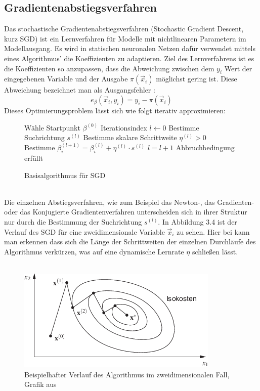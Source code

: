 \subsection{Gradientenabstiegsverfahren}
Das stochastische Gradientenabstiegsverfahren (Stochastic Gradient Descent, kurz SGD) ist ein Lernverfahren für Modelle mit nichtlinearen Parametern im Modellausgang. Es wird in statischen neuronalen Netzen dafür verwendet mittels eines Algorithmus' die Koeffizienten zu adaptieren. Ziel des Lernverfahrens ist es die Koeffizienten so anzupassen, dass die Abweichung  zwischen dem $y_i$ Wert der eingegebenen Variable und der Ausgabe $\pi(\vec x_i)$ möglichst gering ist. Diese Abweichung bezeichnet man als Ausgangsfehler \cite{IV}:
\begin{displaymath}
e_{\beta}(\vec x_i , y_i)=y_i-\pi(\vec x_i)
\end{displaymath}
Dieses Optimierungsproblem lässt sich wie folgt iterativ approximieren:
\begin{figure}[ht]
\centering
\begin{algorithmic}[1]
\STATE Wähle Startpunkt $\beta^{(0)}$
\STATE Iterationsindex $l \leftarrow 0$
\REPEAT
\STATE Bestimme Suchrichtung $s^{(l)}$
\STATE Bestimme skalare Schrittweite $\eta^{(l)} > 0$
\STATE Bestimme $\beta_i^{(l+1)} = \beta_i^{(l)} + \eta^{(l)} \cdot s^{(l)}$
\ENDFOR
\STATE $l=l+1$
\UNTIL Abbruchbedingung erfüllt
\end{algorithmic}
\caption{Basisalgorithmus für SGD}
\end{figure}\\
Die einzelnen Abstiegsverfahren, wie zum Beispiel das Newton-, das Gradienten- oder das Konjugierte Gradientenverfahren unterscheiden sich in ihrer Struktur nur durch die Bestimmung der Suchrichtung $s^{(l)}$\cite{PAPA}. In Abbildung 3.4 ist der Verlauf des SGD für eine zweidimensionale Variable $\vec x_i$ zu sehen. Hier bei kann man erkennen dass sich die Länge der Schrittweiten der einzelnen Durchläufe des Algorithmus verkürzen, was auf eine dynamische Lernrate $\eta$ schließen lässt.\\\\
\begin{figure}[ht]
\centering
\includegraphics[scale=1.7]{bilder/SGD}
\caption{Beispielhafter Verlauf des Algorithmus im zweidimensionalen Fall, Grafik aus \cite{PAPA}}
\end{figure}\\

